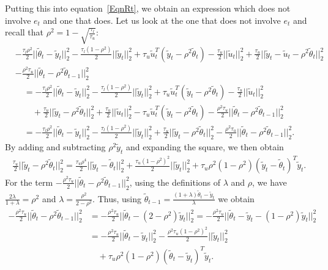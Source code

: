 \documentclass{article}
\begin{document}
Putting this into equation~\eqref{EqnRt}, we obtain an expression which does not involve $e_t$ and one that does. Let us look at the one that does not involve $e_t$ and recall that $\rho^2 = 1 - \sqrt{\frac{\tau_l}{\tau_u}}$:
\begin{align*}
&-\frac{\tau_l\rho^2}{2}||\widetilde{\theta}_t - \widetilde{y}_t||_2^2 - \frac{\tau_l(1 - \rho^2)}{2}||\widetilde{y}_t||_2^2 + \tau_u\widetilde{u}_t^T(\widetilde{y}_t - \rho^2\widetilde{\theta}_t) - \frac{\tau_u}{2}||\widetilde{u}_t||_2^2 + \frac{\tau_u}{2}||\widetilde{y}_t - \widetilde{u}_t - \rho^2\widetilde{\theta}_t||_2^2\\
&- \frac{\rho^2\tau_u}{2}||\widetilde{\theta}_t - \rho^2\widetilde{\theta}_{t - 1}||_2^2\\
& \quad = -\frac{\tau_l\rho^2}{2}||\widetilde{\theta}_t - \widetilde{y}_t||_2^2 - \frac{\tau_l(1 - \rho^2)}{2}||\widetilde{y}_t||_2^2 + \tau_u\widetilde{u}_t^T(\widetilde{y}_t - \rho^2\widetilde{\theta}_t) - \frac{\tau_u}{2}||\widetilde{u}_t||_2^2\\
& \qquad + \frac{\tau_u}{2}||\widetilde{y}_t - \rho^2\widetilde{\theta}_t||_2^2 + \frac{\tau_u}{2}||\widetilde{u}_t||_2^2 - \tau_u\widetilde{u}_t^T(\widetilde{y}_t - \rho^2\widetilde{\theta}_t) - \frac{\rho^2\tau_u}{2}||\widetilde{\theta}_t - \rho^2\widetilde{\theta}_{t - 1}||_2^2\\
& \quad = -\frac{\tau_l\rho^2}{2}||\widetilde{\theta}_t - \widetilde{y}_t||_2^2 - \frac{\tau_l(1 - \rho^2)}{2}||\widetilde{y}_t||_2^2 + \frac{\tau_u}{2}||\widetilde{y}_t - \rho^2\widetilde{\theta}_t||_2^2 - \frac{\rho^2\tau_u}{2}||\widetilde{\theta}_t - \rho^2\widetilde{\theta}_{t - 1}||_2^2.
\end{align*}
By adding and subtracting $\rho^2\widetilde{y}_t$ and expanding the square, we then obtain
\begin{align*}
\frac{\tau_u}{2}||\widetilde{y}_t - \rho^2\widetilde{\theta}_t||_2^2 = \frac{\tau_u\rho^4}{2}||\widetilde{y}_t - \widetilde{\theta}_t||_2^2 + \frac{\tau_u(1 - \rho^2)^2}{2}||\widetilde{y}_t||_2^2 + \tau_u\rho^2(1 - \rho^2)(\widetilde{y}_t - \widetilde{\theta}_t)^T\widetilde{y}_t.
\end{align*}
For the term $- \frac{\rho^2\tau_u}{2}||\widetilde{\theta}_t - \rho^2\widetilde{\theta}_{t - 1}||_2^2$, using the definitions of $\lambda$ and $\rho$, we have $\frac{2\lambda}{1 + \lambda} = \rho^2$ and $\lambda = \frac{\rho^2}{2 - \rho^2}$. Thus, using $\widetilde{\theta}_{t - 1} = \frac{(1 + \lambda)\widetilde{\theta}_t - \widetilde{y}_t}{\lambda}$ we obtain
\begin{align*}
- \frac{\rho^2\tau_u}{2}||\widetilde{\theta}_t - \rho^2\widetilde{\theta}_{t - 1}||_2^2 &= - \frac{\rho^2\tau_u}{2}||\widetilde{\theta}_t - (2 - \rho^2)\widetilde{y}_t||_2^2 = - \frac{\rho^2\tau_u}{2}||\widetilde{\theta}_t - \widetilde{y}_t - (1 - \rho^2)\widetilde{y}_t||_2^2\\
&= - \frac{\rho^2\tau_u}{2}||\widetilde{\theta}_t - \widetilde{y}_t||_2^2 - \frac{\rho^2\tau_u(1 - \rho^2)^2}{2}||\widetilde{y}_t||_2^2\\
& \quad + \tau_u\rho^2(1 - \rho^2)(\widetilde{\theta}_t - \widetilde{y}_t)^T\widetilde{y}_t.
\end{align*}
\end{document}
